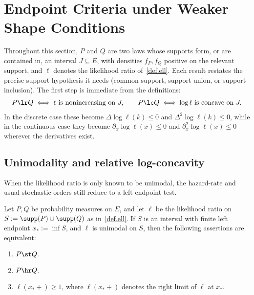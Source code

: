 \documentclass[11pt]{article}
\begin{document}
\section{Endpoint Criteria under Weaker Shape Conditions}
\label{sec:kernel}

Throughout this section, $P$ and $Q$ are two laws whose supports form, or are contained in, an interval $J\subseteq E$, with densities $f_P, f_Q$ positive on the relevant support, and $\ell$ denotes the likelihood ratio of~\eqref{def.ell}. Each result restates the precise support hypothesis it needs (common support, support union, or support inclusion). The first step is immediate from the definitions:
\[
P\lr Q\iff \ell\text{ is nonincreasing on }J,
\qquad
P\lc Q\iff \log\ell\text{ is concave on }J.
\]
In the discrete case these become \(\Delta\log\ell(k)\le 0\) and \(\Delta^2\log\ell(k)\le 0\), while in the continuous case they become \(\partial_x\log\ell(x)\le 0\) and \(\partial_x^2\log\ell(x)\le 0\) wherever the derivatives exist.

\subsection{Unimodality and relative log-concavity}
\label{sec:comparison-kernel}
When the likelihood ratio is only known to be unimodal, the hazard-rate and usual stochastic orders still reduce to a left-endpoint test.

\begin{thm}
\label{thm:unimodal-criterion}
Let \(P,Q\) be probability measures on \(E\), and let \(\ell\) be the likelihood ratio on $S:=\supp(P)\cup\supp(Q)$ as in~\eqref{def.ell}. If \(S\) is an interval with finite left endpoint \(x_*:=\inf S\), and \(\ell\) is unimodal on \(S\), then the following assertions are equivalent:
\begin{enumerate}[label=\textup{(\roman*)}]
\item $P\st Q$.
\item $P\hr Q$.
\item $\ell(x_*+)\ge 1$, where $\ell(x_*+)$ denotes the right limit of \(\ell\) at $x_*$.
\end{enumerate}
\end{thm}
\end{document}

